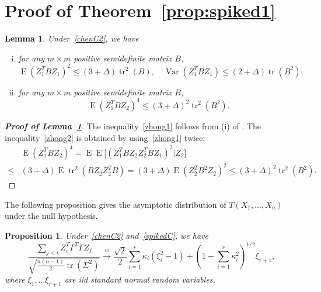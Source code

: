 \documentclass[3p]{elsarticle}
\DeclareMathOperator{\mytr}{tr}
\DeclareMathOperator{\myE}{E}
\DeclareMathOperator{\myVar}{Var}
\theoremstyle{plain}
\newtheorem{proposition}{\quad\quad Proposition}
\newtheorem{lemma}{Lemma}
\theoremstyle{definition}
\theoremstyle{remark}
\begin{document}
\section{Proof of Theorem~\ref{prop:spiked1}}
\begin{lemma}\label{lemma:zhong1}
    Under~\eqref{chenC2}, we have
    \begin{enumerate}[(i)]
        \item
            for any $m\times m$ positive semidefinite matrix $B$,
            \begin{equation*}\label{zhong1}
            \myE(Z_1^T B Z_1)^2\leq (3+\Delta) \mytr^2(B),\quad
            \myVar(Z_1^T B Z_1)\leq (2+\Delta) \mytr(B^2);
            \end{equation*}
        \item
            for any $m\times m$ positive semidefinite matrix $B$,
            \begin{equation*}\label{zhong2}
                \myE (Z_1^T B Z_2)^4\leq (3+\Delta)^2\mytr^2 (B^2).
            \end{equation*}
    \end{enumerate}
\end{lemma}
\begin{proof}[\textbf{Proof of Lemma~\ref{lemma:zhong1}}]
    The inequality~\eqref{zhong1} follows from (i) of \citet[Proposition A.1]{songxi2010}.
    The inequality~\eqref{zhong2} is obtained by using~\eqref{zhong1} twice:
    $$
    \begin{aligned} 
        &\myE (Z_1^T B Z_2)^4
                =\myE\myE\big[ (Z_1^T B Z_2 Z_2^T B Z_1)^2|Z_2\big]
                \\
                \leq &
                (3+\Delta)\myE  \mytr^2 (B Z_2 Z_2^T B)
                =
                (3+\Delta)\myE  (Z_2^T B^2 Z_2 )^2
                \leq (3+\Delta)^2\mytr^2 (B^2).
    \end{aligned}
    $$

\end{proof}
The following proposition gives the asymptotic distribution of $T(X_1,\ldots,X_n)$ under the null hypothesis.
\begin{proposition}\label{prop:spiked2}
    Under~\eqref{chenC2} and~\eqref{spikedC},
    we have
    $$
    \frac{\sum_{j<i} Z_i^T \Gamma^T \Gamma Z_j }
    {\sqrt{\frac{n(n-1)}{2}\mytr(\Sigma^2)}}
    \xrightarrow{w}\frac{\sqrt{2}}{2}\sum_{i=1}^r \kappa_i (\xi_i^2-1)+(1-\sum_{i=1}^r \kappa_i^2)^{1/2} \xi_{r+1},
    $$
    where $\xi_1,\ldots \xi_{r+1}$ are iid standard normal random variables.
\end{proposition}
\end{document}
